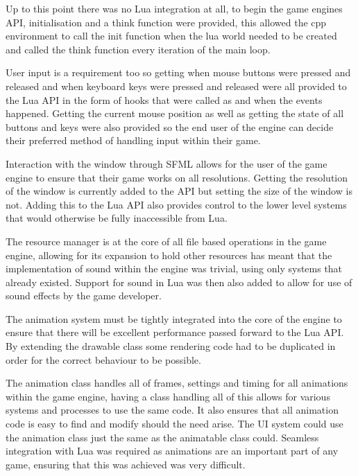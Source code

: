\documentclass[11pt,a4paper,titlepage]{report}
\begin{document}

    Up to this point there was no Lua integration at all, to begin the game engines API, initialisation and a think function were provided, this allowed the cpp environment to call the init function when the lua world needed to be created and called the think function every iteration of the main loop.

    User input is a requirement too so getting when mouse buttons were pressed and released and when keyboard keys were pressed and released were all provided to the Lua API in the form of hooks that were called as and when the events happened. Getting the current mouse position as well as getting the state of all buttons and keys were also provided so the end user of the engine can decide their preferred method of handling input within their game.


   Interaction with the window through SFML allows for the user of the game engine to ensure that their game works on all resolutions. Getting the resolution of the window is currently added to the API but setting the size of the window is not. Adding this to the Lua API also provides control to the lower level systems that would otherwise be fully inaccessible from Lua. 


    The resource manager is at the core of all file based operations in the game engine, allowing for its expansion to hold other resources has meant that the implementation of sound within the engine was trivial, using only systems that already existed. Support for sound in Lua was then also added to allow for use of sound effects by the game developer.


    The animation system must be tightly integrated into the core of the engine to ensure that there will be excellent performance passed forward to the Lua API. By extending the drawable class some rendering code had to be duplicated in order for the correct behaviour to be possible.

	The animation class handles all of frames, settings and timing for all animations within the game engine, having a class handling all of this allows for various systems and processes to use the same code. It also ensures that all animation code is easy to find and modify should the need arise. The UI system could use the animation class just the same as the animatable class could. Seamless integration with Lua was required as animations are an important part of any game, ensuring that this was achieved was very difficult.
\end{document}
